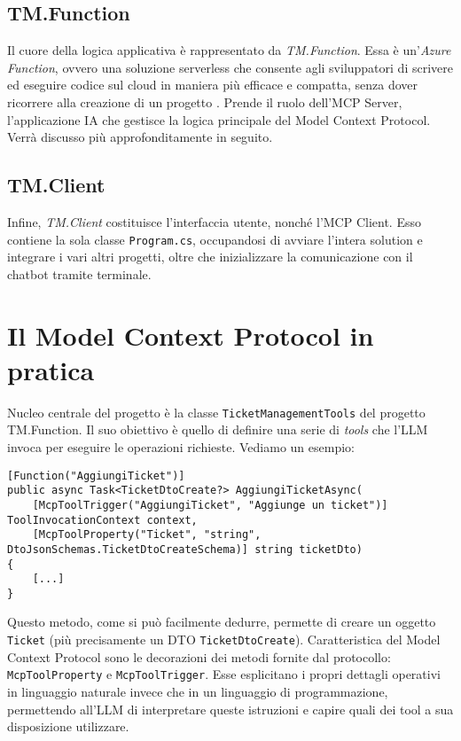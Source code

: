 \subsection{TM.Function}
Il cuore della logica applicativa è rappresentato da \textit{TM.Function}. Essa è un'\textit{Azure Function}, ovvero una soluzione serverless
che consente agli sviluppatori di scrivere ed eseguire codice sul cloud in maniera più efficace e compatta, senza dover ricorrere alla
creazione di un progetto \cite{azurefunctions_msdocs}. Prende il ruolo dell'MCP Server, l'applicazione IA che gestisce la logica principale del
Model Context Protocol. Verrà discusso più approfonditamente in seguito.

\subsection{TM.Client}
Infine, \textit{TM.Client} costituisce l'interfaccia utente, nonché l'MCP Client. Esso contiene la sola classe \texttt{Program.cs}, occupandosi
di avviare l'intera solution e integrare i vari altri progetti, oltre che inizializzare la comunicazione con il chatbot tramite terminale.

\newpage
\section{Il Model Context Protocol in pratica}
Nucleo centrale del progetto è la classe \texttt{TicketManagementTools} del progetto TM.Function. Il suo obiettivo è quello di definire una serie
di \textit{tools} che l'LLM invoca per eseguire le operazioni richieste. Vediamo un esempio:

\begin{scriptsize}
\begin{verbatim}
[Function("AggiungiTicket")]
public async Task<TicketDtoCreate?> AggiungiTicketAsync(
    [McpToolTrigger("AggiungiTicket", "Aggiunge un ticket")] ToolInvocationContext context,
    [McpToolProperty("Ticket", "string", DtoJsonSchemas.TicketDtoCreateSchema)] string ticketDto)
{
    [...]
}
\end{verbatim}
\end{scriptsize}

Questo metodo, come si può facilmente dedurre, permette di creare un oggetto \texttt{Ticket} (più precisamente un DTO \texttt{TicketDtoCreate}).
Caratteristica del Model Context Protocol sono le decorazioni dei metodi fornite dal protocollo: \texttt{McpToolProperty} e \texttt{McpToolTrigger}. 
Esse esplicitano i propri dettagli operativi in linguaggio naturale invece che in un linguaggio di programmazione, permettendo all'LLM di interpretare 
queste istruzioni e capire quali dei tool a sua disposizione utilizzare.

